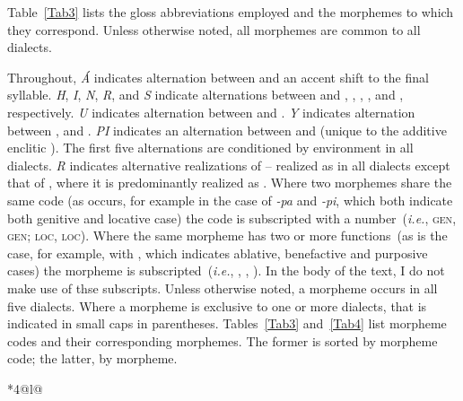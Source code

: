 \label{ch:notconv}
\begin{refsection} 

Table~\ref{Tab3} lists the gloss abbreviations employed and the morphemes to which they correspond. Unless otherwise noted, all morphemes are common to all dialects.

Throughout, \textit{\'A} indicates alternation between \textipa{[\'a]} and an accent shift to the final syllable. \textit{H}, \textit{I}, \textit{N}, \textit{R}, and \textit{S} indicate alternations between \textipa{[\o]} and \textipa{[h]}, \textipa{[i]}, \textipa{[n]}, \textipa{[r]}, and \textipa{[s]}, respectively. \textit{U} indicates alternation between \textipa{[u]} and \textipa{[a]}. \textit{Y} indicates alternation between \textipa{[y]}, \textipa{[i]} and \textipa{[\o]}. \textit{PI} indicates an alternation between \textipa{[pi]} and \textipa{[\o]} (unique to the additive enclitic ). The first five alternations are conditioned by environment in all dialects. \textit{R} indicates alternative realizations of  -- realized as \textipa{[r]} in all dialects except that of \CH{}, where it is predominantly realized as \textipa{[l]}. Where two morphemes share the same code (as occurs, for example in the case of \mbox{\textit{-pa}} and \mbox{\textit{-pi}}, which both indicate both genitive and locative case) the code is subscripted with a number~(\emph{i.e.}, \textsc{gen}, \textsc{gen}; \textsc{loc}, \textsc{loc}). Where the same morpheme has two or more functions~(as is the case, for example, with , which indicates ablative, benefactive and purposive cases) the morpheme is subscripted~(\emph{i.e.}, , , ). In the body of the text, I do not make use of thse subscripts. Unless otherwise noted, a morpheme occurs in all five dialects. Where a morpheme is exclusive to one or more dialects, that is indicated in small caps in parentheses. Tables~\ref{Tab3} and~\ref{Tab4} list morpheme codes and their corresponding morphemes. The former is sorted by morpheme code; the latter, by morpheme.

\begin{small}
\begin{longtable}{*{4}{@{\hspace{1ex}}l}@{\hspace{1ex}}}
\caption{Morpheme codes~(sorted by code)}\label{Tab3}


\end{longtable}
\end{small}
\end{refsection}
